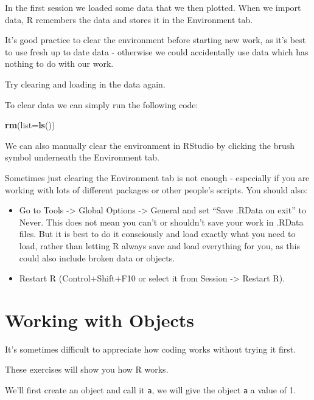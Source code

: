 \documentclass[]{book}
\makeatletter
\newenvironment{Shaded}{\begin{snugshade}}{\end{snugshade}}
\newcommand{\KeywordTok}[1]{\textcolor[rgb]{0.13,0.29,0.53}{\textbf{#1}}}
\newcommand{\DataTypeTok}[1]{\textcolor[rgb]{0.13,0.29,0.53}{#1}}
\newcommand{\NormalTok}[1]{#1}
\providecommand{\tightlist}{%
  \setlength{\itemsep}{0pt}\setlength{\parskip}{0pt}}
\newenvironment{kframe}{%
\medskip{}
\setlength{\fboxsep}{.8em}
 \def\at@end@of@kframe{}%
 \ifinner\ifhmode%
  \def\at@end@of@kframe{\end{minipage}}%
  \begin{minipage}{\columnwidth}%
 \fi\fi%
 \def\FrameCommand##1{\hskip\@totalleftmargin \hskip-\fboxsep
 \colorbox{shadecolor}{##1}\hskip-\fboxsep
     \hskip-\linewidth \hskip-\@totalleftmargin \hskip\columnwidth}%
 \MakeFramed {\advance\hsize-\width
   \@totalleftmargin\z@ \linewidth\hsize
   \@setminipage}}%
 {\par\unskip\endMakeFramed%
 \at@end@of@kframe}
\renewenvironment{Shaded}{\begin{kframe}}{\end{kframe}}
\makeatother
\begin{document}
In the first session we loaded some data that we then plotted. When we
import data, R remembers the data and stores it in the Environment tab.

It's good practice to clear the environment before starting new work, as
it's best to use fresh up to date data - otherwise we could accidentally
use data which has nothing to do with our work.

Try clearing and loading in the data again.

To clear data we can simply run the following code:

\begin{Shaded}
\begin{Highlighting}[]
\KeywordTok{rm}\NormalTok{(}\DataTypeTok{list=}\KeywordTok{ls}\NormalTok{())}
\end{Highlighting}
\end{Shaded}

We can also manually clear the environment in RStudio by clicking the
brush symbol underneath the Environment tab.

Sometimes just clearing the Environment tab is not enough - especially
if you are working with lots of different packages or other people's
scripts. You should also:

\begin{itemize}
\tightlist
\item
  Go to Tools -\textgreater{} Global Options -\textgreater{} General and
  set ``Save .RData on exit'' to Never. This does not mean you can't or
  shouldn't save your work in .RData files. But it is best to do it
  consciously and load exactly what you need to load, rather than
  letting R always save and load everything for you, as this could also
  include broken data or objects.
\item
  Restart R (Control+Shift+F10 or select it from Session -\textgreater{}
  Restart R).
\end{itemize}

\section{Working with Objects}\label{working-with-objects}

It's sometimes difficult to appreciate how coding works without trying
it first.

These exercises will show you how R works.

We'll first create an object and call it \texttt{a}, we will give the
object \texttt{a} a value of 1.
\end{document}
